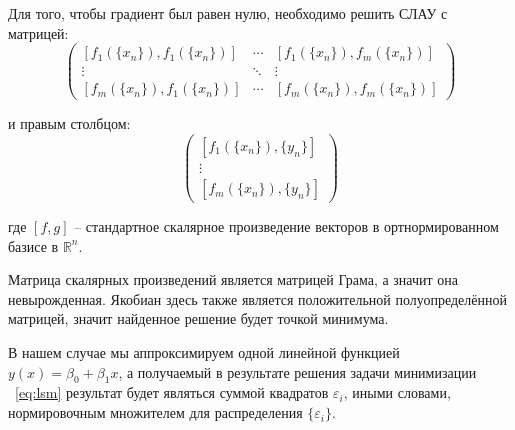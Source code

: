 Для того, чтобы градиент был равен нулю, необходимо решить СЛАУ с матрицей:
\begin{equation*}
\begin{pmatrix}
[f_1(\{x_n\}), f_1(\{x_n\})] & \cdots & [f_1(\{x_n\}), f_m(\{x_n\})] \\
\vdots & \ddots & \vdots \\
[f_m(\{x_n\}), f_1(\{x_n\})] & \cdots & [f_m(\{x_n\}), f_m(\{x_n\})]
\end{pmatrix}
\end{equation*}

и правым столбцом:
\begin{equation*}
\begin{pmatrix}
[f_1(\{x_n\}), \{y_n\}] \\
\vdots\\
[f_m(\{x_n\}), \{y_n\}]
\end{pmatrix}
\end{equation*}

где $[f, g]$ -- стандартное скалярное произведение векторов в ортнормированном базисе в $\mathbb{R}^n$.

Матрица скалярных произведений является матрицей Грама, а значит она невырожденная. Якобиан здесь также является положительной полуопределённой матрицей, значит найденное решение будет точкой минимума.

В нашем случае мы аппроксимируем одной линейной функцией $y(x) = \beta_0 + \beta_1 x$, а получаемый в результате решения задачи минимизации ~\eqref{eq:lsm} результат будет являться суммой квадратов $\varepsilon_i$, иными словами, нормировочным множителем для распределения $\{\varepsilon_i\}$.
